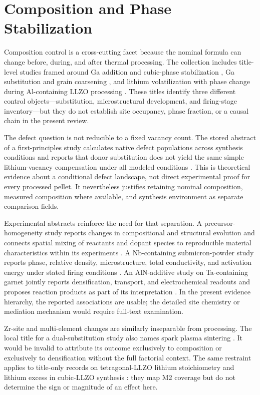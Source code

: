 \section{Composition and Phase Stabilization}

Composition control is a cross-cutting facet because the nominal formula can change before, during, and after thermal processing. The collection includes title-level studies framed around Ga addition and cubic-phase stabilization \cite{shinawi2013stabilization}, Ga substitution and grain coarsening \cite{li2016ga}, and lithium volatilization with phase change during Al-containing LLZO processing \cite{montoya2024lithium}. These titles identify three different control objects---substitution, microstructural development, and firing-stage inventory---but they do not establish site occupancy, phase fraction, or a causal chain in the present review.

The defect question is not reducible to a fixed vacancy count. The stored abstract of a first-principles study calculates native defect populations across synthesis conditions and reports that donor substitution does not yield the same simple lithium-vacancy compensation under all modeled conditions \cite{squires2019native}. This is theoretical evidence about a conditional defect landscape, not direct experimental proof for every processed pellet. It nevertheless justifies retaining nominal composition, measured composition where available, and synthesis environment as separate comparison fields.

Experimental abstracts reinforce the need for that separation. A precursor-homogeneity study reports changes in compositional and structural evolution and connects spatial mixing of reactants and dopant species to reproducible material characteristics within its experiments \cite{parascos2022compositional}. A Nb-containing submicron-powder study reports phase, relative density, microstructure, total conductivity, and activation energy under stated firing conditions \cite{yan2020submicron}. An AlN-additive study on Ta-containing garnet jointly reports densification, transport, and electrochemical readouts and proposes reaction products as part of its interpretation \cite{zhang2022high}. In the present evidence hierarchy, the reported associations are usable; the detailed site chemistry or mediation mechanism would require full-text examination.

Zr-site and multi-element changes are similarly inseparable from processing. The local title for a dual-substitution study also names spark plasma sintering \cite{dong2019dual}. It would be invalid to attribute its outcome exclusively to composition or exclusively to densification without the full factorial context. The same restraint applies to title-only records on tetragonal-LLZO lithium stoichiometry \cite{ilina2014lithium} and lithium excess in cubic-LLZO synthesis \cite{norazman2021the}: they map M2 coverage but do not determine the sign or magnitude of an effect here.

